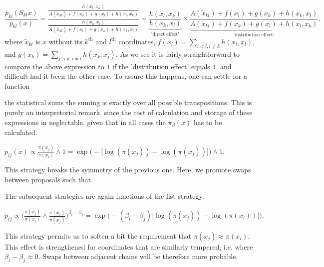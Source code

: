 \begin{equation*}
	\frac{p_{kl}(S_{kl}x)}{p_{kl}(x)} = \frac{\frac{h(x_l,x_k)}{A(\tilde{x}_{kl})+f(x_k)+g(x_l)+h(x_l,x_k)}}{
	\frac{h(x_k,x_l)}{A(\tilde{x}_{kl})+f(x_l)+g(x_k)+h(x_k,x_l)}
	} = 
	\underbrace{\frac{h(x_l,x_k)}{h(x_k,x_l)}}_\text{'direct effect'} 
	\times 
	\underbrace{\frac{A(\tilde{x}_{kl})+f(x_l)+g(x_k)+h(x_k,x_l)}{A(\tilde{x}_{kl})+f(x_k)+g(x_l)+h(x_l,x_k)}}_\text{'distribution effect'},	 	 	
\end{equation*}  
where $\tilde{x}_{kl}$ is $x$ without its $k^\text{th}$ and $l^\text{th}$ coordinates, $f(x_l) = \sum_{i<l, i\not=k} h(x_i, x_l)$, and $g(x_k) = \sum_{j>k, i\not=l}h(x_k, x_j)$. As we see it is fairly straightforward to compare the above expression to $1$ if the 'distribution effect' equals $1$, and difficult had it been the other case. To assure this happens, one can settle for a function  


 the statistical sums the suming is exactly over all possible transpositions. This is purely an interpretorial remark, since the cost of calculation and storage of these expressions in neglectable, given that in all cases the $\pi_\beta(x)$ has to be calculated. 

\begin{strategy}[resume]
	\item 
		$
			p_{ij}(x) \propto 
			\frac{\pi (x_j)}{\pi (x_i)} \wedge 1 = 
			\exp \Big( - \big[ \log ( \pi(x_j) ) - \log ( \pi(x_j) ) \big]\Big) \wedge 1.$\label{strat2}
\end{strategy}

This strategy breaks the symmetry of the previous one. Here, we promote swaps between proposals such that 


The subsequent strategies are again functions of the fist strategy.

\begin{strategy}[resume]
	\item 
		$p_{ij} \propto 
			\Big( \frac{\pi (x_j)}{\pi( x_i )} \wedge 
			\frac{\pi (	x_i)}{\pi( x_j )} \Big)^{\beta_i - \beta_j} = 
		\exp \Big( - (\beta_i - \beta_j)\big| \log ( \pi(x_j) ) - \log ( \pi(x_i) ) \big| \Big).$\label{strat3} 
\end{strategy}

This strategy permits us to soften a bit the requirement that $\pi(x_j) \approx \pi (x_i)$. This effect is strengthened for coordinates that are similarly tempered, i.e. where $\beta_i - \beta_j \approx 0$. Swaps between adjacent chains will be therefore more probable. 

